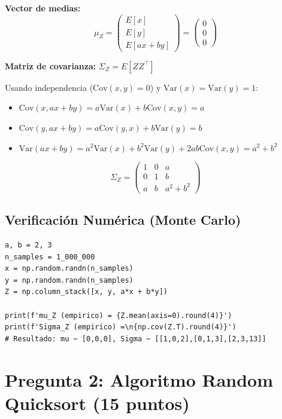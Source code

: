 \documentclass[11pt,a4paper]{article}
\begin{document}
\textbf{Vector de medias:}
\[
\mu_Z = \begin{pmatrix} E[x] \\ E[y] \\ E[ax+by] \end{pmatrix} = \begin{pmatrix} 0 \\ 0 \\ 0 \end{pmatrix}
\]

\textbf{Matriz de covarianza:} $\Sigma_Z = E[ZZ^\top]$

Usando independencia ($\text{Cov}(x,y)=0$) y $\text{Var}(x)=\text{Var}(y)=1$:
\begin{itemize}
    \item $\text{Cov}(x, ax+by) = a\text{Var}(x) + b\text{Cov}(x,y) = a$
    \item $\text{Cov}(y, ax+by) = a\text{Cov}(y,x) + b\text{Var}(y) = b$
    \item $\text{Var}(ax+by) = a^2\text{Var}(x) + b^2\text{Var}(y) + 2ab\text{Cov}(x,y) = a^2+b^2$
\end{itemize}

\[
\boxed{\Sigma_Z = \begin{pmatrix} 1 & 0 & a \\ 0 & 1 & b \\ a & b & a^2+b^2 \end{pmatrix}}
\]

\subsection{Verificación Numérica (Monte Carlo)}

\begin{lstlisting}[caption={Verificación de Q1 por simulación}]
a, b = 2, 3
n_samples = 1_000_000
x = np.random.randn(n_samples)
y = np.random.randn(n_samples)
Z = np.column_stack([x, y, a*x + b*y])

print(f'mu_Z (empirico) = {Z.mean(axis=0).round(4)}')
print(f'Sigma_Z (empirico) =\n{np.cov(Z.T).round(4)}')
# Resultado: mu ~ [0,0,0], Sigma ~ [[1,0,2],[0,1,3],[2,3,13]]
\end{lstlisting}

\section{Pregunta 2: Algoritmo Random Quicksort (15 puntos)}
\end{document}
